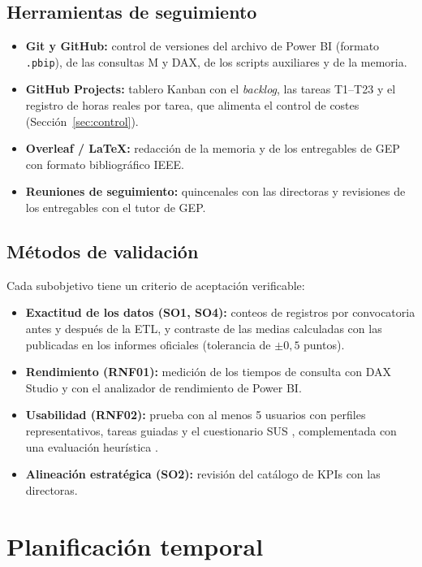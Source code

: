 \documentclass[12pt, a4paper, oneside]{report}
\begin{document}
\section{Herramientas de seguimiento}
\begin{itemize}
    \item \textbf{Git y GitHub:} control de versiones del archivo de Power BI (formato \texttt{.pbip}), de las consultas M y DAX, de los scripts auxiliares y de la memoria.
    \item \textbf{GitHub Projects:} tablero Kanban con el \textit{backlog}, las tareas T1--T23 y el registro de horas reales por tarea, que alimenta el control de costes (Sección~\ref{sec:control}).
    \item \textbf{Overleaf / \LaTeX:} redacción de la memoria y de los entregables de GEP con formato bibliográfico IEEE.
    \item \textbf{Reuniones de seguimiento:} quincenales con las directoras y revisiones de los entregables con el tutor de GEP.
\end{itemize}

\section{Métodos de validación}
Cada subobjetivo tiene un criterio de aceptación verificable:
\begin{itemize}
    \item \textbf{Exactitud de los datos (SO1, SO4):} conteos de registros por convocatoria antes y después de la ETL, y contraste de las medias calculadas con las publicadas en los informes oficiales \cite{csase_resultats} (tolerancia de $\pm 0{,}5$ puntos).
    \item \textbf{Rendimiento (RNF01):} medición de los tiempos de consulta con DAX Studio \cite{dax_studio} y con el analizador de rendimiento de Power BI.
    \item \textbf{Usabilidad (RNF02):} prueba con al menos 5 usuarios con perfiles representativos, tareas guiadas y el cuestionario SUS \cite{brooke1996sus}, complementada con una evaluación heurística \cite{nielsen1993usability}.
    \item \textbf{Alineación estratégica (SO2):} revisión del catálogo de KPIs con las directoras.
\end{itemize}

\chapter{Planificación temporal}
\end{document}
